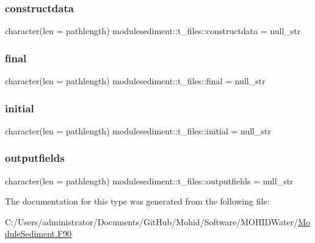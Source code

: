\subsubsection{\texorpdfstring{constructdata}{constructdata}}
{\footnotesize\ttfamily character(len = pathlength) modulesediment\+::t\+\_\+files\+::constructdata = null\+\_\+str\hspace{0.3cm}{\ttfamily [private]}}

\mbox{\label{structmodulesediment_1_1t__files_add3a9d13d0503d02318da01c04064385}} 
\subsubsection{\texorpdfstring{final}{final}}
{\footnotesize\ttfamily character(len = pathlength) modulesediment\+::t\+\_\+files\+::final = null\+\_\+str\hspace{0.3cm}{\ttfamily [private]}}

\mbox{\label{structmodulesediment_1_1t__files_a336f90e71d4aaca59abf850649cc343b}} 
\subsubsection{\texorpdfstring{initial}{initial}}
{\footnotesize\ttfamily character(len = pathlength) modulesediment\+::t\+\_\+files\+::initial = null\+\_\+str\hspace{0.3cm}{\ttfamily [private]}}

\mbox{\label{structmodulesediment_1_1t__files_aef004e10320e09292fc0541e4a0e0f8f}} 
\subsubsection{\texorpdfstring{outputfields}{outputfields}}
{\footnotesize\ttfamily character(len = pathlength) modulesediment\+::t\+\_\+files\+::outputfields = null\+\_\+str\hspace{0.3cm}{\ttfamily [private]}}



The documentation for this type was generated from the following file\+:\begin{DoxyCompactItemize}
\item 
C\+:/\+Users/administrator/\+Documents/\+Git\+Hub/\+Mohid/\+Software/\+M\+O\+H\+I\+D\+Water/\mbox{\hyperlink{_module_sediment_8_f90}{Module\+Sediment.\+F90}}\end{DoxyCompactItemize}
